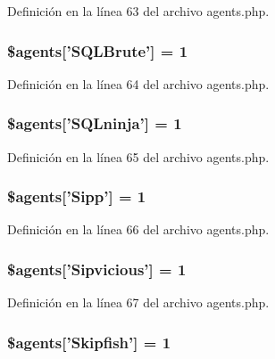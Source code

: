 Definición en la línea 63 del archivo agents.\-php.

\hypertarget{agents_8php_aa652aac21e20a569779a9abca9513701}{
\subsubsection[{\$agents}]{\setlength{\rightskip}{0pt plus 5cm}\$agents\mbox{[}'S\-Q\-L\-Brute'\mbox{]} = 1}}\label{agents_8php_aa652aac21e20a569779a9abca9513701}


Definición en la línea 64 del archivo agents.\-php.

\hypertarget{agents_8php_a5bf2813e2ddf38c389438a6c8acdb922}{
\subsubsection[{\$agents}]{\setlength{\rightskip}{0pt plus 5cm}\$agents\mbox{[}'S\-Q\-Lninja'\mbox{]} = 1}}\label{agents_8php_a5bf2813e2ddf38c389438a6c8acdb922}


Definición en la línea 65 del archivo agents.\-php.

\hypertarget{agents_8php_a4b5d9c86ce0e36d96fb7d26559b4de29}{
\subsubsection[{\$agents}]{\setlength{\rightskip}{0pt plus 5cm}\$agents\mbox{[}'Sipp'\mbox{]} = 1}}\label{agents_8php_a4b5d9c86ce0e36d96fb7d26559b4de29}


Definición en la línea 66 del archivo agents.\-php.

\hypertarget{agents_8php_ad06c87717ebedfc7c6b8b62e128af403}{
\subsubsection[{\$agents}]{\setlength{\rightskip}{0pt plus 5cm}\$agents\mbox{[}'Sipvicious'\mbox{]} = 1}}\label{agents_8php_ad06c87717ebedfc7c6b8b62e128af403}


Definición en la línea 67 del archivo agents.\-php.

\hypertarget{agents_8php_aef1ba3d6f2a995373f6bd2710468f2e4}{
\subsubsection[{\$agents}]{\setlength{\rightskip}{0pt plus 5cm}\$agents\mbox{[}'Skipfish'\mbox{]} = 1}}\label{agents_8php_aef1ba3d6f2a995373f6bd2710468f2e4}


